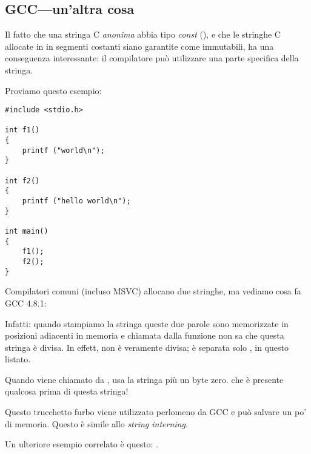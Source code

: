 \subsection{GCC---un'altra cosa}
\label{use_parts_of_C_strings}

Il fatto che una stringa C \emph{anonima} abbia tipo \emph{const} (),
e che le stringhe C allocate in in segmenti costanti siano garantite come immutabili, ha una conseguenza interessante:
il compilatore può utilizzare una parte specifica della stringa.

Proviamo questo esempio:

\begin{lstlisting}[style=customc]
#include <stdio.h>

int f1()
{
	printf ("world\n");
}

int f2()
{
	printf ("hello world\n");
}

int main()
{
	f1();
	f2();
}
\end{lstlisting}

Compilatori \CCpp{} comuni (incluso MSVC) allocano due stringhe, ma vediamo cosa fa GCC 4.8.1:



Infatti: quando stampiamo la stringa 
queste due parole sono memorizzate in posizioni adiacenti in memoria e \puts chiamata dalla funzione 
non sa che questa stringa è divisa.
In effett, non è veramente divisa; è separata solo , in questo listato.

Quando \puts viene chiamato da , usa la stringa  più un byte zero. \puts che è presente qualcosa prima di questa stringa!

Questo trucchetto furbo viene utilizzato perlomeno da GCC e può salvare un po' di memoria.
Questo è simile allo \emph{string interning}.

Un ulteriore esempio correlato è questo: .
